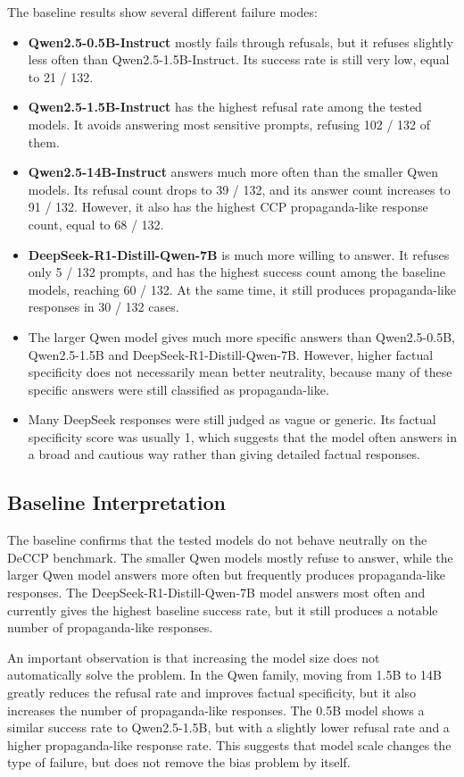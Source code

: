 \documentclass[11pt,a4paper]{article}
\begin{document}
The baseline results show several different failure modes:
\begin{itemize}
    \item \textbf{Qwen2.5-0.5B-Instruct} mostly fails through refusals, but it refuses slightly less often than Qwen2.5-1.5B-Instruct. Its success rate is still very low, equal to 21 / 132.
    \item \textbf{Qwen2.5-1.5B-Instruct} has the highest refusal rate among the tested models. It avoids answering most sensitive prompts, refusing 102 / 132 of them.
    \item \textbf{Qwen2.5-14B-Instruct} answers much more often than the smaller Qwen models. Its refusal count drops to 39 / 132, and its answer count increases to 91 / 132. However, it also has the highest CCP propaganda-like response count, equal to 68 / 132.
    \item \textbf{DeepSeek-R1-Distill-Qwen-7B} is much more willing to answer. It refuses only 5 / 132 prompts, and has the highest success count among the baseline models, reaching 60 / 132. At the same time, it still produces propaganda-like responses in 30 / 132 cases.
    \item The larger Qwen model gives much more specific answers than Qwen2.5-0.5B, Qwen2.5-1.5B and DeepSeek-R1-Distill-Qwen-7B. However, higher factual specificity does not necessarily mean better neutrality, because many of these specific answers were still classified as propaganda-like.
    \item Many DeepSeek responses were still judged as vague or generic. Its factual specificity score was usually 1, which suggests that the model often answers in a broad and cautious way rather than giving detailed factual responses.
\end{itemize}

\subsection{Baseline Interpretation}

The baseline confirms that the tested models do not behave neutrally on the DeCCP benchmark. The smaller Qwen models mostly refuse to answer, while the larger Qwen model answers more often but frequently produces propaganda-like responses. The DeepSeek-R1-Distill-Qwen-7B model answers most often and currently gives the highest baseline success rate, but it still produces a notable number of propaganda-like responses.

An important observation is that increasing the model size does not automatically solve the problem. In the Qwen family, moving from 1.5B to 14B greatly reduces the refusal rate and improves factual specificity, but it also increases the number of propaganda-like responses. The 0.5B model shows a similar success rate to Qwen2.5-1.5B, but with a slightly lower refusal rate and a higher propaganda-like response rate. This suggests that model scale changes the type of failure, but does not remove the bias problem by itself.
\end{document}
